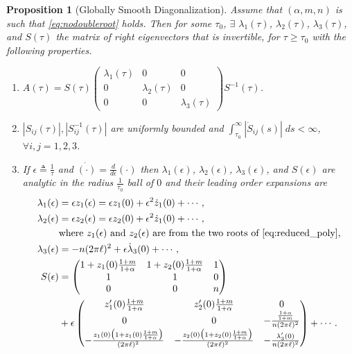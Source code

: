 \documentclass[a4paper,11pt]{article}
\def\l{(2\pi \ell)}
\newtheorem{proposition}{Proposition}[section]
\theoremstyle{remark}
\begin{document}
\begin{proposition}[Globally Smooth Diagonalization] \label{prop:ctsdiag}
 Assume that $(\alpha,m,n)$ is such that \eqref{eq:nodoubleroot} holds. Then for some $\tau_0$, $\exists$ $\lambda_1(\tau)$, $\lambda_2(\tau)$, $\lambda_3(\tau)$, and $S(\tau)$ the matrix of right eigenvectors that is invertible, for $\tau\ge\tau_0$  with the following properties.
 \begin{enumerate}
  \item $A(\tau) = S(\tau) \begin{pmatrix} \lambda_1(\tau) & 0 & 0\\ 0 & \lambda_2(\tau) & 0 \\ 0 & 0 & \lambda_3(\tau) \end{pmatrix} S^{-1}(\tau)$.%
  \item $|S_{ij}(\tau)|, |S^{-1}_{ij}(\tau)|$ are uniformly bounded and %
  $\int_{\tau_0}^\infty |\dot{S}_{ij}(s)|\; ds <\infty$, $\forall i,j=1,2,3$.
  \item If $\epsilon\triangleq \frac{1}{\tau}$ and $\dot{(\cdot)}=\frac{d}{d\epsilon}(\cdot)$ then $\lambda_1(\epsilon)$, $\lambda_2(\epsilon)$, $\lambda_3(\epsilon)$, and $S(\epsilon)$ are analytic in the radius $\frac{1}{\tau_0}$ ball of $0$ and their leading order expansions are
  \begin{align}
   \lambda_1(\epsilon) &= \epsilon z_1(\epsilon) = \epsilon z_1(0) + \epsilon^2 \dot z_1(0) + \cdots,\nonumber\\
   \lambda_2(\epsilon) &= \epsilon z_2(\epsilon) =\epsilon z_2(0) + \epsilon^2 \dot z_1(0) + \cdots,\nonumber\\ &\text{where $z_1(\epsilon)$ and $z_2(\epsilon)$ are from the two roots of \eqref{eq:reduced_poly},}\nonumber \\
   \lambda_3(\epsilon) &= -n\l^2 + \epsilon\dot\lambda_3(0) + \cdots, \nonumber\\
   S(\epsilon) 
   &=\begin{pmatrix}
    1 + z_1(0)\frac{1+m}{1+\alpha} & 1 + z_2(0)\frac{1+m}{1+\alpha} & 1 \nonumber\\
    1 & 1 & 0\\
    0 & 0 & n
   \end{pmatrix} \\&+ \epsilon
   \begin{pmatrix}
    z_1'(0)\frac{1+m}{1+\alpha} & z_2'(0)\frac{1+m}{1+\alpha} & 0 \nonumber\\
    0 & 0 & -\frac{\frac{1+\alpha}{1+m}}{n\l^2}\\
    -\frac{z_1(0)\big(1+z_1(0)\frac{1+m}{1+\alpha}\big)}{\l^2} & -\frac{z_2(0)\big(1+z_2(0)\frac{1+m}{1+\alpha}\big)}{\l^2} & -\frac{\lambda_3'(0)}{n\l^2} \nonumber\\
   \end{pmatrix} + \cdots. 
  \end{align}
 \end{enumerate}
\end{proposition}
\end{document}
